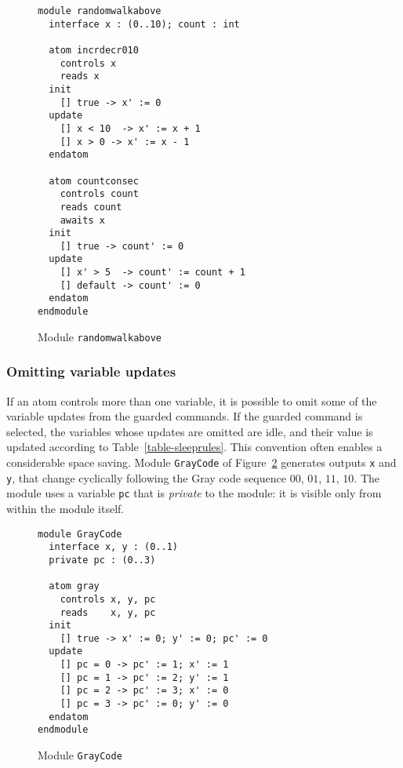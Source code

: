{\begin{figure}
\begin{verbatim}
module randomwalkabove
  interface x : (0..10); count : int

  atom incrdecr010
    controls x
    reads x 
  init
    [] true -> x' := 0
  update 
    [] x < 10  -> x' := x + 1
    [] x > 0 -> x' := x - 1
  endatom

  atom countconsec 
    controls count
    reads count
    awaits x
  init
    [] true -> count' := 0
  update 
    [] x' > 5  -> count' := count + 1
    [] default -> count' := 0
  endatom
endmodule 
\end{verbatim}
\caption{Module {\tt randomwalkabove}}
\label{fig-randomwalkabove}
\end{figure}


\subsubsection{Omitting variable updates}

If an atom controls more than one variable, it is possible to omit
some of the variable updates from the guarded commands.  If the
guarded command is selected, the variables whose updates are omitted
are idle, and their value is updated according to
Table~\ref{table-sleeprules}.  This convention often enables a
considerable space saving.  Module {\tt GrayCode} of
Figure~\ref{fig-modulepc} generates outputs {\tt x} and {\tt y}, that
change cyclically following the Gray code sequence $00$, $01$, $11$,
$10$.  The module uses a variable {\tt pc} that is {\em
private\/} to the module: it is visible only
from within the module itself.

\begin{figure}
\begin{verbatim}
module GrayCode
  interface x, y : (0..1)
  private pc : (0..3)

  atom gray
    controls x, y, pc
    reads    x, y, pc
  init
    [] true -> x' := 0; y' := 0; pc' := 0
  update
    [] pc = 0 -> pc' := 1; x' := 1
    [] pc = 1 -> pc' := 2; y' := 1
    [] pc = 2 -> pc' := 3; x' := 0
    [] pc = 3 -> pc' := 0; y' := 0
  endatom
endmodule
\end{verbatim}
\caption{Module {\tt GrayCode}}
\label{fig-modulepc}
\end{figure}



}
